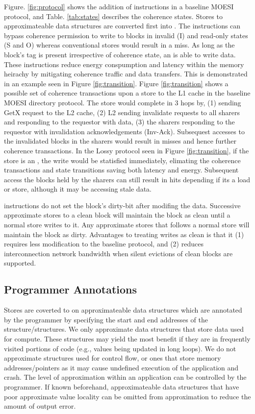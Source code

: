 Figure. \ref{fig:protocol} shows the addition of \storea instructions in a baseline MOESI protocol, and Table. \ref{tab:states} describes the coherence states. Stores to approximateable data structures are converted first into \storea. The \storea instructions can bypass coherence permission to write to blocks in invalid (I) and read-only states (S and O) whereas conventional stores would result in a miss. As long as the block's tag is present irrespective of coherence state, an \storea is able to write data. These \storea instructions reduce energy conspumption and latency within the memory heirachy by mitigating coherence traffic and data transfers. This is demonstrated in an example seen in Figure \ref{fig:transition}. Figure \ref{fig:transition} shows a possible set of coherence transactions upon a store to the L1 cache in the baseline MOESI directory protocol. The store would complete in 3 hops by, (1) sending GetX request to the L2 cache, (2) L2 sending invalidate requests to all sharers and responding to the requestor with data, (3) the sharers responding to the requestor with invalidation acknowledgements (Inv-Ack). Subsequest accesses to the invalidated blocks in the sharers would result in misses and hence further coherence transactions. In the Lossy protocol seen in Figure \ref{fig:transition}, if the store is an \storea, the write would be statisfied immediately, elimating the coherence transactions and state transitions saving both latency and energy. Subsequent access the blocks held by the sharers can still result in hits depending if its a load or store, although it may be accessing stale data. 

\storea instructions do not set the block's dirty-bit after modifing the data. Successive approximate stores to a clean block will maintain the block as clean until a normal store writes to it. Any approximate stores that follows a normal store will maintain the block as dirty. Advantages to treating \storea writes as clean is that it (1) requires less modification to the baseline protocol, and (2) reduces interconnection network bandwidth when silent evictions of clean blocks are supported.

\subsection{Programmer Annotations}

Stores are coverted to \storea on approximateable data structures which are annotated by the programmer by specifying the start and end addresses of the structure/structures. We only approximate data structures that store data used for compute. These structures may yield the most benefit if they are in frequently visited portions of code (e.g., values being updated in long loops). We do not approximate structures used for control flow, or ones that store memory addresses/pointers as it may cause undefined execution of the application and crash. The level of approximation within an application can be controlled by the programmer. If known beforehand, approximateable data structures that have poor approximate value locality can be omitted from approximation to reduce the amount of output error.

